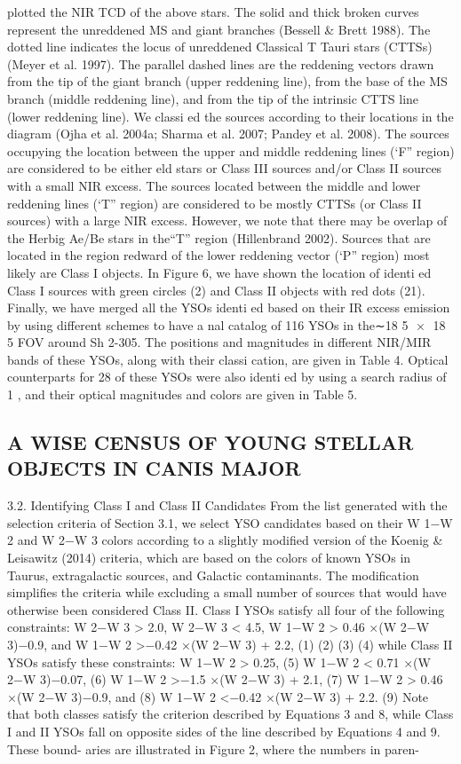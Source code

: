 \documentclass[../main.tex]{subfiles}
\begin{document}
{plotted the NIR TCD of the above stars. The solid and
thick broken curves represent the unreddened MS and
giant branches (Bessell & Brett 1988). The dotted line
indicates the locus of unreddened Classical T Tauri stars
(CTTSs) (Meyer et al. 1997). The parallel dashed lines
are the reddening vectors drawn from the tip of the giant
branch (upper reddening line), from the base of the MS
branch (middle reddening line), and from the tip of the
intrinsic CTTS line (lower reddening line). We classi ed
the sources according to their locations in the diagram
(Ojha et al. 2004a; Sharma et al. 2007; Pandey et al.
2008). The sources occupying the location between the
upper and middle reddening lines (‘F” region) are
considered to be either eld stars or Class III sources
and/or Class II sources with a small NIR excess. The
sources located between the middle and lower reddening
lines (‘T” region) are considered to be mostly CTTSs (or
Class II sources) with a large NIR excess. However, we
note that there may be overlap of the Herbig Ae/Be stars
in the“T” region (Hillenbrand 2002). Sources that are
located in the region redward of the lower reddening
vector (‘P” region) most likely are Class I objects. In
Figure 6, we have shown the location of identi ed Class I
sources with green circles (2) and Class II objects with red
dots (21).
Finally, we have merged all the YSOs identi ed based on
their IR excess emission by using different schemes to have a
nal catalog of 116 YSOs in the∼18 5
×
18 5 FOV around
Sh 2-305. The positions and magnitudes in different NIR/MIR
bands of these YSOs, along with their classi cation, are given
in Table 4. Optical counterparts for 28 of these YSOs were also
identi ed by using a search radius of 1 , and their optical
magnitudes and colors are given in Table 5.

\subsection{A WISE CENSUS OF YOUNG STELLAR OBJECTS IN CANIS MAJOR}

3.2. Identifying Class I and Class II Candidates
From the list generated with the selection criteria of Section
3.1, we select YSO candidates based on their W 1−W 2 and
W 2−W 3 colors according to a slightly modified version of
the Koenig & Leisawitz (2014) criteria, which are based on
the colors of known YSOs in Taurus, extragalactic sources,
and Galactic contaminants. The modification simplifies the
criteria while excluding a small number of sources that would
have otherwise been considered Class II. Class I YSOs satisfy
all four of the following constraints:
W 2−W 3 > 2.0, W 2−W 3 < 4.5, W 1−W 2 > 0.46 ×(W 2−W 3)−0.9, and W 1−W 2 >−0.42 ×(W 2−W 3) + 2.2, (1)
(2)
(3)
(4)
while Class II YSOs satisfy these constraints:
W 1−W 2 > 0.25, (5)
W 1−W 2 < 0.71 ×(W 2−W 3)−0.07, (6)
W 1−W 2 >−1.5 ×(W 2−W 3) + 2.1, (7)
W 1−W 2 > 0.46 ×(W 2−W 3)−0.9, and (8)
W 1−W 2 <−0.42 ×(W 2−W 3) + 2.2. (9)
Note that both classes satisfy the criterion described by
Equations 3 and 8, while Class I and II YSOs fall on opposite
sides of the line described by Equations 4 and 9. These bound-
aries are illustrated in Figure 2, where the numbers in paren-

}
\end{document}
